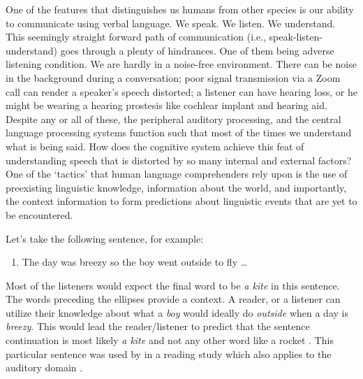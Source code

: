 \documentclass[a4paper, nobind]{templates/ociamthesis}
\providecommand{\tightlist}{%
  \setlength{\itemsep}{0pt}\setlength{\parskip}{0pt}}
\begin{document}
One of the features that distinguishes us humans from other species is our ability to communicate using verbal language.
We speak. We listen. We understand.
This seemingly straight forward path of communication (i.e., speak-listen-understand) goes through a plenty of hindrances.
One of them being adverse listening condition.
We are hardly in a noise-free environment.
There can be noise in the background during a conversation;
poor signal transmission via a Zoom call can render a speaker's speech distorted;
a listener can have hearing loss, or he might be wearing a hearing prostesis like cochlear implant and hearing aid.
Despite any or all of these, the peripheral auditory processing, and the central language processing systems function such that most of the times we understand what is being said.
How does the cognitive system achieve this feat of understanding speech that is distorted by so many internal and external factors?
One of the `tactics' that human language comprehenders rely upon is the use of preexisting linguistic knowledge, information about the world, and importantly, the context information to form predictions about linguistic events that are yet to be encountered.

Let's take the following sentence, for example:

\begin{enumerate}
\def\labelenumi{(\arabic{enumi})}
\tightlist
\item
  The day was breezy so the boy went outside to fly \ldots{}
\end{enumerate}

Most of the listeners would expect the final word to be \emph{a kite} in this sentence.
The words preceding the ellipses provide a context.
A reader, or a listener can utilize their knowledge about what a \emph{boy} would ideally do \emph{outside} when a day is \emph{breezy}.
This would lead the reader/listener to predict that the sentence continuation is most likely \emph{a kite} and not any other word like a rocket \autocites{Delong2005}[cf.][]{Nieuwland2020a}.
This particular sentence was used by \textcite{Delong2005} in a reading study which also applies to the auditory domain \autocite[see][]{Altmann2007}.
\end{document}
